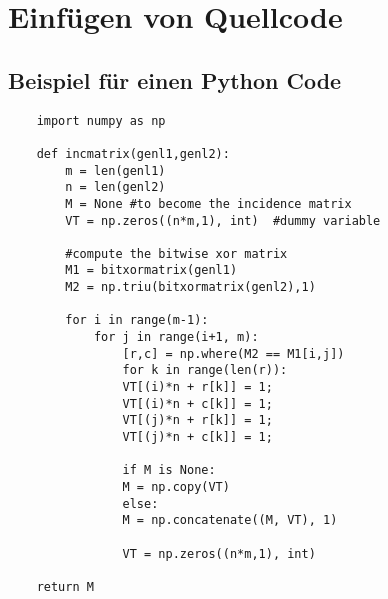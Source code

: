 \chapter{Einfügen von Quellcode}
\label{chap:code}

\section{Beispiel für einen Python Code}

\begin{verbatim}
	import numpy as np
	
	def incmatrix(genl1,genl2):
		m = len(genl1)
		n = len(genl2)
		M = None #to become the incidence matrix
		VT = np.zeros((n*m,1), int)  #dummy variable
	
		#compute the bitwise xor matrix
		M1 = bitxormatrix(genl1)
		M2 = np.triu(bitxormatrix(genl2),1) 
	
		for i in range(m-1):
			for j in range(i+1, m):
				[r,c] = np.where(M2 == M1[i,j])
				for k in range(len(r)):
				VT[(i)*n + r[k]] = 1;
				VT[(i)*n + c[k]] = 1;
				VT[(j)*n + r[k]] = 1;
				VT[(j)*n + c[k]] = 1;
				
				if M is None:
				M = np.copy(VT)
				else:
				M = np.concatenate((M, VT), 1)
				
				VT = np.zeros((n*m,1), int)
	
	return M
\end{verbatim}
